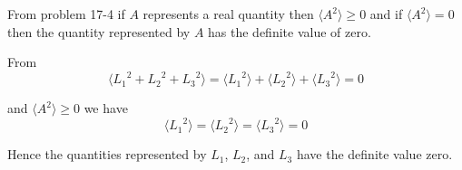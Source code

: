 


\bigskip
From problem 17-4 if $A$ represents a real quantity then $\langle A^2\rangle\ge0$ and
if $\langle A^2\rangle=0$ then the quantity represented by $A$ has the definite value of zero.

\bigskip
From
\begin{equation*}
\langle{L_1}^2+{L_2}^2+{L_3}^2\rangle
=\langle{L_1}^2\rangle+\langle{L_2}^2\rangle+\langle{L_3}^2\rangle=0
\end{equation*}

and $\langle A^2\rangle\ge0$ we have
\begin{equation*}
\langle{L_1}^2\rangle=\langle{L_2}^2\rangle=\langle{L_3}^2\rangle=0
\end{equation*}

Hence the quantities represented by $L_1$, $L_2$, and $L_3$ have the definite value zero.


